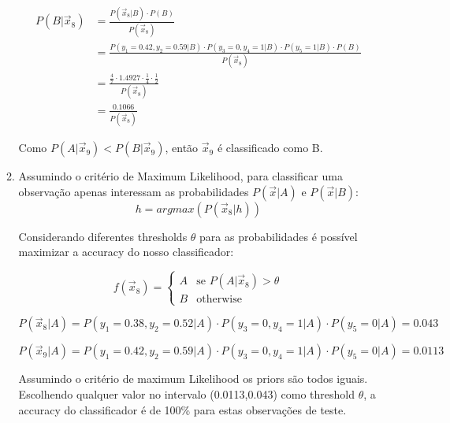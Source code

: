 \documentclass[a4paper,12pt]{article} %
\begin{document}
\begin{enumerate}
\begin{enumerate}
\begin{equation*}
    \begin{aligned}
        P(B|\vec{x}_8) & = \frac{P(\vec{x}_8|B) \cdot P(B)}{P(\vec{x}_8)} \\
                       & = \frac{P(y_1=0.42,y_2=0.59|B) \cdot P(y_3=0,y_4=1|B) \cdot P(y_5=1|B) \cdot P(B)}{P(\vec{x}_8)} \\
                       & = \frac{\frac{4}{7} \cdot 1.4927 \cdot \frac{1}{4} \cdot \frac{1}{2}}{P(\vec{x}_8)} \\
                       & = \frac{0.1066}{P(\vec{x}_8)}
    \end{aligned}
\end{equation*}

Como $P(A|\vec{x}_9) < P(B|\vec{x}_9)$, então $\vec{x}_9$ é classificado como B. 

\item 
Assumindo o critério de Maximum Likelihood, para classificar uma observação apenas interessam as probabilidades $P(\vec{x}|A)$ e $P(\vec{x}|B)$:
\begin{equation*}
    h = argmax(P(\vec{x}_8|h))
\end{equation*}

Considerando diferentes thresholds $\theta$ para as probabilidades é possível maximizar a accuracy do nosso classificador:

\begin{equation*}
    f(\vec{x}_8) = \begin{cases} 
        A & \text{se } P(A|\vec{x}_8) > \theta \\
        B &  \text{otherwise}
     \end{cases}
\end{equation*}


\begin{equation*}
    P(\vec{x}_8|A) = P(y_1=0.38,y_2=0.52|A) \cdot P(y_3=0,y_4=1|A) \cdot P(y_5=0|A) = 0.043
\end{equation*}

\begin{equation*}
    P(\vec{x}_9|A) = P(y_1=0.42,y_2=0.59|A) \cdot P(y_3=0,y_4=1|A) \cdot P(y_5=0|A) = 0.0113
\end{equation*}

Assumindo o critério de maximum Likelihood os priors são todos iguais.
Escolhendo qualquer valor no intervalo (0.0113,0.043) como threshold $\theta$, a accuracy do classificador é de 100\% para estas observações de teste.

\end{enumerate}


\end{enumerate}
\end{document}
